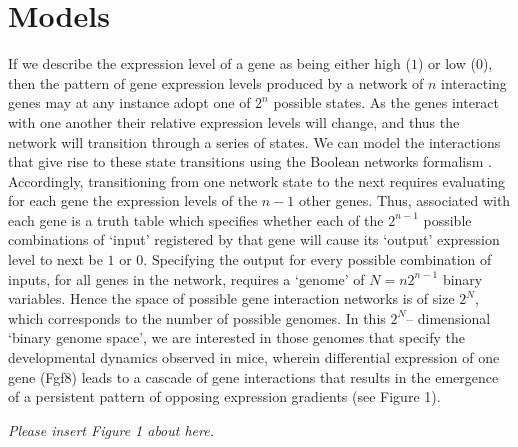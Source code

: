 \documentclass[10pt,letterpaper]{article}
\begin{document}

\section*{Models}

If we describe the expression level of a gene as being either high ($1$) or low ($0$), then the pattern of gene expression levels produced by a network of $n$ interacting genes may at any instance adopt one of $2^n$ possible states. As the genes interact with one another their relative expression levels will change, and thus the network will transition through a series of states. We can model the interactions that give rise to these state transitions using the Boolean networks formalism \cite{Kauffman1993}. Accordingly, transitioning from one network state to the next requires evaluating for each gene the expression levels of the $n-1$ other genes. Thus, associated with each gene is a truth table which specifies whether each of the $2^{n-1}$ possible combinations of `input' registered by that gene will cause its `output' expression level to next be $1$ or $0$. Specifying the output for every possible combination of inputs, for all genes in the network,  requires a `genome' of $N=n2^{n-1}$ binary variables. Hence the space of possible gene interaction networks is of size $2^N$, which corresponds to the number of possible genomes. In this $2^N$-- dimensional `binary genome space', we are interested in those genomes that specify the developmental dynamics observed in mice, wherein differential expression of one gene (Fgf8) leads to a cascade of gene interactions that results in the emergence of a persistent pattern of opposing expression gradients (see Figure 1). %

\vspace{1em}\emph{\noindent Please insert Figure 1 about here.}\vspace{1em}
\end{document}
